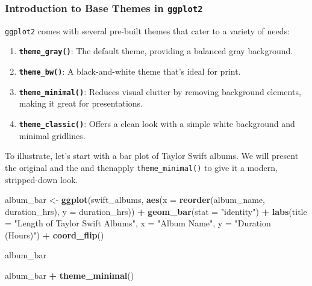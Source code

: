 \documentclass[
]{book}
\newenvironment{Shaded}{\begin{snugshade}}{\end{snugshade}}
\newcommand{\AttributeTok}[1]{\textcolor[rgb]{0.13,0.29,0.53}{#1}}
\newcommand{\FunctionTok}[1]{\textcolor[rgb]{0.13,0.29,0.53}{\textbf{#1}}}
\newcommand{\NormalTok}[1]{#1}
\newcommand{\OtherTok}[1]{\textcolor[rgb]{0.56,0.35,0.01}{#1}}
\newcommand{\SpecialCharTok}[1]{\textcolor[rgb]{0.81,0.36,0.00}{\textbf{#1}}}
\newcommand{\StringTok}[1]{\textcolor[rgb]{0.31,0.60,0.02}{#1}}
\providecommand{\tightlist}{%
  \setlength{\itemsep}{0pt}\setlength{\parskip}{0pt}}
\begin{document}
\subsubsection*{\texorpdfstring{Introduction to Base Themes in \texttt{ggplot2}}{Introduction to Base Themes in ggplot2}}\label{introduction-to-base-themes-in-ggplot2}

\texttt{ggplot2} comes with several pre-built themes that cater to a variety of needs:

\begin{enumerate}
\def\labelenumi{\arabic{enumi}.}
\tightlist
\item
  \textbf{\texttt{theme\_gray()}}: The default theme, providing a balanced gray background.
\item
  \textbf{\texttt{theme\_bw()}}: A black-and-white theme that's ideal for print.
\item
  \textbf{\texttt{theme\_minimal()}}: Reduces visual clutter by removing background elements, making it great for presentations.
\item
  \textbf{\texttt{theme\_classic()}}: Offers a clean look with a simple white background and minimal gridlines.
\end{enumerate}

To illustrate, let's start with a bar plot of Taylor Swift albums. We will present the original and the and thenapply \texttt{theme\_minimal()} to give it a modern, stripped-down look.

\begin{Shaded}
\begin{Highlighting}[]
\NormalTok{album\_bar }\OtherTok{\textless{}{-}} \FunctionTok{ggplot}\NormalTok{(swift\_albums, }\FunctionTok{aes}\NormalTok{(}\AttributeTok{x =} \FunctionTok{reorder}\NormalTok{(album\_name, duration\_hrs), }\AttributeTok{y =}\NormalTok{ duration\_hrs)) }\SpecialCharTok{+}
  \FunctionTok{geom\_bar}\NormalTok{(}\AttributeTok{stat =} \StringTok{"identity"}\NormalTok{) }\SpecialCharTok{+}
  \FunctionTok{labs}\NormalTok{(}\AttributeTok{title =} \StringTok{"Length of Taylor Swift Albums"}\NormalTok{, }\AttributeTok{x =} \StringTok{"Album Name"}\NormalTok{, }\AttributeTok{y =} \StringTok{"Duration (Hours)"}\NormalTok{) }\SpecialCharTok{+}
  \FunctionTok{coord\_flip}\NormalTok{()}

\NormalTok{album\_bar }

\NormalTok{album\_bar }\SpecialCharTok{+}
  \FunctionTok{theme\_minimal}\NormalTok{()}
\end{Highlighting}
\end{Shaded}
\end{document}
